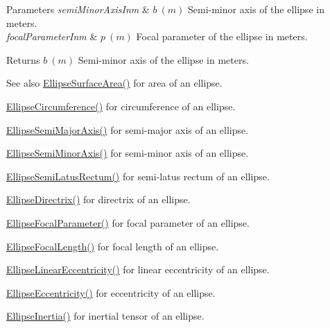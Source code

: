 \begin{DoxyParams}{Parameters}
{\em semi\+Minor\+Axis\+Inm} & $ b\ (m)$ Semi-\/minor axis of the ellipse in meters. \\
\hline
{\em focal\+Parameter\+Inm} & $ p\ (m)$ Focal parameter of the ellipse in meters. \\
\hline
\end{DoxyParams}
\begin{DoxyReturn}{Returns}
$ b\ (m)$ Semi-\/minor axis of the ellipse in meters. 
\end{DoxyReturn}
\begin{DoxySeeAlso}{See also}
\mbox{\hyperlink{group___e_g_x_math-_geometry-2_d-_ellipse-_surface_area_ga4ce8c8323e9718ce5458f4ab7f6d823d}{Ellipse\+Surface\+Area()}} for area of an ellipse. 

\mbox{\hyperlink{group___e_g_x_math-_geometry-2_d-_ellipse-_circumference_ga4172802ac674eb53467b44928ac635c7}{Ellipse\+Circumference()}} for circumference of an ellipse. 

\mbox{\hyperlink{group___e_g_x_math-_geometry-2_d-_ellipse-_semi_major_axis_ga646a2ca065f4ac3f666a9ea22f3bb527}{Ellipse\+Semi\+Major\+Axis()}} for semi-\/major axis of an ellipse. 

\mbox{\hyperlink{group___e_g_x_math-_geometry-2_d-_ellipse-_semi_minor_axis_gae461acf3333565d69527dd86e9aa2b32}{Ellipse\+Semi\+Minor\+Axis()}} for semi-\/minor axis of an ellipse. 

\mbox{\hyperlink{group___e_g_x_math-_geometry-2_d-_ellipse-_semi_latus_rectum_gacfd1844eb4ef3d1ee3c0b460a6442ae6}{Ellipse\+Semi\+Latus\+Rectum()}} for semi-\/latus rectum of an ellipse. 

\mbox{\hyperlink{group___e_g_x_math-_geometry-2_d-_ellipse-_directrix_gace8f72a8efbc9c18d3eb689151405106}{Ellipse\+Directrix()}} for directrix of an ellipse. 

\mbox{\hyperlink{group___e_g_x_math-_geometry-2_d-_ellipse-_focal_parameter_ga4cd01a38c72c092ef9791351948bf69b}{Ellipse\+Focal\+Parameter()}} for focal parameter of an ellipse. 

\mbox{\hyperlink{group___e_g_x_math-_geometry-2_d-_ellipse-_focal_length_gab8d63de7640c880cfecaeada6f2afdac}{Ellipse\+Focal\+Length()}} for focal length of an ellipse. 

\mbox{\hyperlink{group___e_g_x_math-_geometry-2_d-_ellipse-_linear_eccentricity_gac70b3010e30aa8b73deb50fe2b9b9a91}{Ellipse\+Linear\+Eccentricity()}} for linear eccentricity of an ellipse. 

\mbox{\hyperlink{group___e_g_x_math-_geometry-2_d-_ellipse-_eccentricity_ga6a0a7fba17f782616894cfc447628c33}{Ellipse\+Eccentricity()}} for eccentricity of an ellipse. 

\mbox{\hyperlink{group___e_g_x_math-_geometry-2_d-_ellipse-_inertia_ga10a3049c2f04b50f271fb01dc62e4cf8}{Ellipse\+Inertia()}} for inertial tensor of an ellipse. 
\end{DoxySeeAlso}

